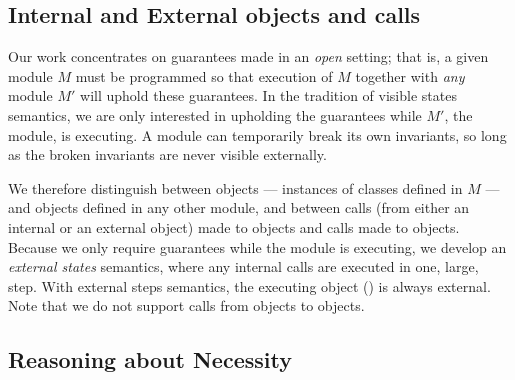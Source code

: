 


\subsection{Internal and External objects and calls}
\label{s:concepts}

Our work concentrates on guarantees made in an \emph{open} setting; that is, a given module
$M$ must be programmed so that %
execution of $M$ together with \emph{any} \externalM 
module $M'$ will uphold these guarantees. In the tradition of
visible states semantics, we are  only interested in upholding the guarantees while 
$M'$, the  \emph{\externalM} module, is executing. A module can
temporarily break its own invariants,
so long as the broken invariants are never visible externally.
   
We therefore distinguish between \emph{\internalO}
objects --- instances of classes defined in $M$ ---
and \emph{\externalO} objects defined in any other module, and
between \emph{\internalC} calls  (from either an internal or an external object)  made %
 to \internalO objects and \emph{\externalC} calls made %
 to \externalC objects. %
%
%
Because we only require guarantees while 
the  \externalM module  is executing,
we develop an \emph{external states} semantics, where
 any internal calls are executed in one, large, step.
With external steps semantics,  the executing object () is always   external. 
Note that we do not support calls from
\internalO objects to \externalO objects.
 

\newcommand{\vertsp} {\vspace{.02in}} 
 
\subsection{Reasoning about Necessity}
\label{s:approach}

